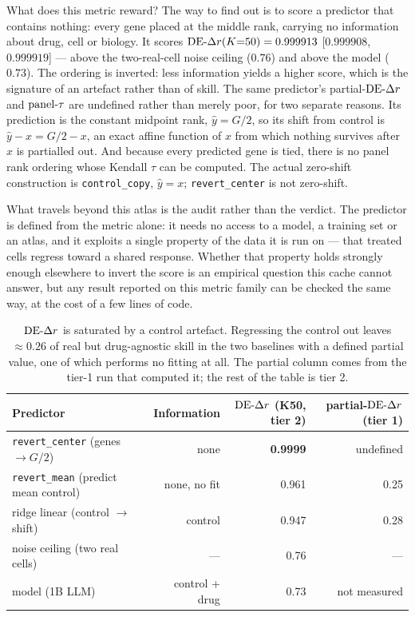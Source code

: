 What does this metric reward? The way to find out is to score a predictor that contains nothing:
every gene placed at the middle rank, carrying no information about drug, cell or biology. It scores
$\textrm{DE-}\Delta r(K{=}50) = 0.999913$ [$0.999908$, $0.999919$] --- above the two-real-cell noise ceiling ($0.76$)
and above the model ($0.73$). The ordering is inverted: less information yields a higher score,
which is the signature of an artefact rather than of skill. The same predictor's partial-$\textrm{DE-}\Delta r$ and
$\textrm{panel-}\tau$ are undefined rather than merely poor, for two separate reasons. Its prediction is the
constant midpoint rank, $\hat y = G/2$, so its shift from control is
$\hat y-x=G/2-x$, an exact affine function of $x$ from which nothing survives after $x$ is
partialled out. And because every predicted gene is tied, there is no panel rank ordering whose
Kendall $\tau$ can be computed. The actual zero-shift construction is \texttt{control\_copy},
$\hat y=x$; \texttt{revert\_center} is not zero-shift.

What travels beyond this atlas is the audit rather than the verdict. The predictor is defined from
the metric alone: it needs no access to a model, a training set or an atlas, and it exploits a
single property of the data it is run on --- that treated cells regress toward a shared response.
Whether that property holds strongly enough elsewhere to invert the score is an empirical question
this cache cannot answer, but any result reported on this metric family can be checked the same way,
at the cost of a few lines of code.

\begin{table}[htbp]
\centering
\footnotesize
\setlength{\tabcolsep}{4pt}
\begin{tabular}{lrrr}
\toprule
Predictor & Information & $\textrm{DE-}\Delta r$ (K50, tier 2) & partial-$\textrm{DE-}\Delta r$ (tier 1) \\
\midrule
\texttt{revert\_center} (genes $\rightarrow G/2$) & none & \textbf{0.9999} & undefined \\
\texttt{revert\_mean} (predict mean control) & none, no fit & 0.961 & 0.25 \\
ridge linear (control $\rightarrow$ shift) & control & 0.947 & 0.28 \\
noise ceiling (two real cells) & --- & 0.76 & --- \\
model (1B LLM) & control + drug & 0.73 & not measured \\
\bottomrule
\end{tabular}
\caption{$\textrm{DE-}\Delta r$ is saturated by a control artefact. Regressing the control out leaves
$\approx 0.26$ of real but drug-agnostic skill in the two baselines with a defined partial value,
one of which performs no fitting at all. The partial column comes
from the tier-1 run that computed it; the rest of the table is tier 2.}
\label{tab:de-artifact}
\end{table}


